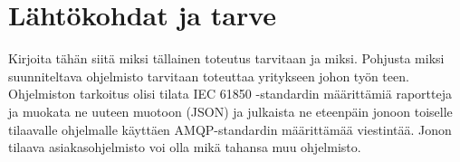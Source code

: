 \chapter{Lähtökohdat ja tarve}
\label{ch:lähtökohdat ja tarve}
Kirjoita tähän siitä miksi tällainen toteutus tarvitaan ja miksi. Pohjusta miksi suunniteltava ohjelmisto tarvitaan toteuttaa yritykseen johon työn teen. Ohjelmiston tarkoitus olisi tilata IEC 61850 -standardin määrittämiä raportteja ja muokata ne uuteen muotoon (JSON) ja julkaista ne eteenpäin jonoon toiselle tilaavalle ohjelmalle käyttäen AMQP-standardin määrittämää viestintää. Jonon tilaava asiakasohjelmisto voi olla mikä tahansa muu ohjelmisto.